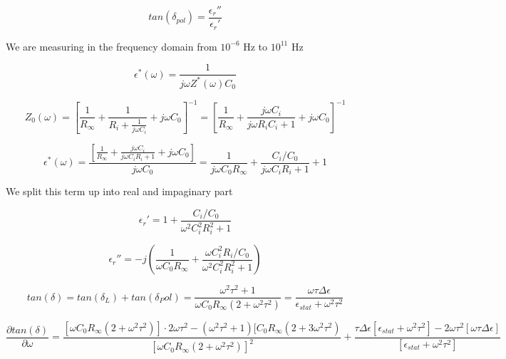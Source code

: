 \begin{equation}
tan (\delta_{pol}) = \frac {\epsilon_r'' } {\epsilon_r'}
\end{equation}


We are measuring in the frequency domain from $10^{-6}$ Hz to $10^{11}$ Hz 

\begin{equation}
\epsilon^*(\omega) = \frac{1}{j \omega  Z^*(\omega) C_0}
\end{equation}

\begin{equation}
Z_0(\omega)=[\frac{1}{R_\infty}+\frac{1}{R_i+\frac{1}{j \omega C_i}}+j \omega C_0]^{-1} = [\frac{1}{R_\infty}+\frac{j \omega C_i}{j\omega R_i  C_i+1}+j \omega C_0]^{-1}
\end{equation}

\begin{equation}
\epsilon^*(\omega)= \frac{[\frac{1}{R_\infty}+\frac{j \omega C_i}{j\omega C_i R_i  +1}+j \omega C_0]}{j \omega C_0} = \frac{1}{j \omega C_0 R_\infty}+ \frac{C_i/C_0}{j\omega C_i R_i  +1}+1
\end{equation}

We split this term up into real and impaginary part 

\begin{equation}
\epsilon_r' = 1+ \frac{C_i/C_0}{\omega^2 C_i^2 R_i^2 +1}
\end{equation}

\begin{equation}
\epsilon_r'' = -j \left(\frac{1}{\omega C_0 R_\infty}+\frac{\omega C_i^2 R_i / C_0}{\omega^2 C_i^2 R_i^2 +1} \right)
\end{equation}

\begin{equation}
tan(\delta) = tan(\delta_L) + tan( \delta_Pol) = \frac{\omega^2 \tau^2+1}{\omega C_0 R_\infty (2+ \omega^2 \tau^2)}=\frac{\omega \tau \Delta \epsilon}{\epsilon_{stat} + \omega^2 \tau^2}
\end{equation}

\begin{equation}
\frac{\partial tan(\delta)}{ \partial \omega} = \frac{[\omega C_0 R_\infty (2+\omega^2 \tau^2)]\cdot 2 \omega \tau^2 - (\omega^2 \tau^2 +1) [C_0 R_\infty (2+3 \omega^2 \tau^2)  }{[\omega C_0 R_\infty (2+\omega^2 \tau^2)]^2}+ \frac{\tau \Delta \epsilon [\epsilon_{stat} + \omega^2 \tau^2] - 2 \omega \tau^2 [\omega \tau \Delta \epsilon]}{[\epsilon_{stat} +\omega^2 \tau^2]}
\end{equation}

